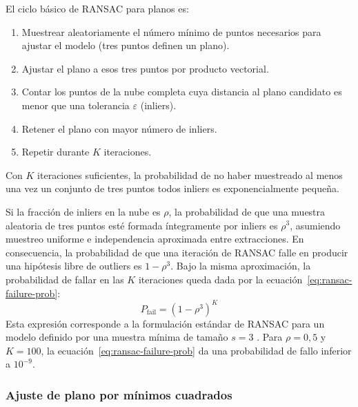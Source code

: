El ciclo básico de RANSAC para planos es:
\begin{enumerate}
  \item Muestrear aleatoriamente el número mínimo de puntos necesarios para
        ajustar el modelo (tres puntos definen un plano).
  \item Ajustar el plano a esos tres puntos por producto vectorial.
  \item Contar los puntos de la nube completa cuya distancia al plano
        candidato es menor que una tolerancia $\varepsilon$ (inliers).
  \item Retener el plano con mayor número de inliers.
  \item Repetir durante $K$ iteraciones.
\end{enumerate}
Con $K$ iteraciones suficientes, la probabilidad de no haber muestreado al
menos una vez un conjunto de tres puntos todos inliers es exponencialmente
pequeña.

Si la fracción de inliers en la nube es $\rho$, la probabilidad de que una
muestra aleatoria de tres puntos esté formada íntegramente por inliers es
$\rho^3$, asumiendo muestreo uniforme e independencia aproximada entre
extracciones. En consecuencia, la probabilidad de que una iteración de
RANSAC falle en producir una hipótesis libre de outliers es $1 - \rho^3$.
Bajo la misma aproximación, la probabilidad de fallar en las $K$
iteraciones queda dada por la ecuación~\ref{eq:ransac-failure-prob}:
\begin{equation}
  \label{eq:ransac-failure-prob}
  P_{\mathrm{fail}} = (1 - \rho^3)^K
\end{equation}
Esta expresión corresponde a la formulación estándar de RANSAC para un
modelo definido por una muestra mínima de tamaño $s = 3$ \cite{Thrun2005}.
Para $\rho = 0{,}5$ y $K = 100$, la ecuación~\ref{eq:ransac-failure-prob}
da una probabilidad de fallo inferior a $10^{-9}$.

\subsubsection{Ajuste de plano por mínimos cuadrados}
\label{subsec:lm-v3-ls}

